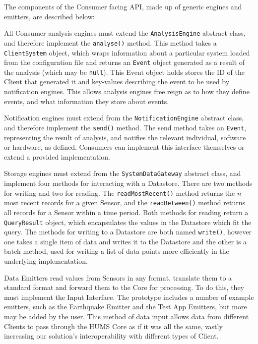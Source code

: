 \documentclass[10pt,a4paper]{article}
\begin{document}
The components of the Consumer facing API, made up of generic engines and emitters, are described below:
\begin{description} [noitemsep]	
	\item[Analysis Engines] All Consumer analysis engines must extend the \texttt{AnalysisEngine} abstract class, and therefore implement the \texttt{analyse()} method. This method takes a \texttt{ClientSystem} object, which wraps information about a particular system loaded from the configuration file and returns an \texttt{Event} object generated as a result of the analysis (which may be \texttt{null}). This Event object holds stores the ID of the Client that generated it and key-values describing the event to be used by notification engines. This allows analysis engines free reign as to how they define events, and what information they store about events.
	\item[Notification Engines] Notification engines must extend from the \texttt{NotificationEngine} abstract class, and therefore implement the \texttt{send()} method. The send method takes an \texttt{Event}, representing the result of analysis, and notifies the relevant individual, software or hardware, as defined. Consumers can implement this interface themselves or extend a provided implementation.
	\item[Storage Engines] Storage engines must extend from the \texttt{SystemDataGateway} abstract class, and implement four methods for interacting with a Datastore. There are two methods for writing and two for reading. The \texttt{readMostRecent()} method returns the $n$ most recent records for a given Sensor, and the \texttt{readBetween()} method returns all records for a Sensor within a time period. Both methods for reading return a \texttt{QueryResult} object, which encapsulates the values in the Datastore which fit the query. The methods for writing to a Datastore are both named \texttt{write()}, however one takes a single item of data and writes it to the Datastore and the other is a batch method, used for writing a list of data points more efficiently in the underlying implementation. 
	\item[Data Emitters] Data Emitters read values from Sensors in any format, translate them to a standard format and forward them to the Core for processing. To do this, they must implement the Input Interface. The prototype includes a number of example emitters, such as the Earthquake Emitter and the Test App Emitters, but more may be added by the user. This method of data input allows data from different Clients to pass through the HUMS Core as if it was all the same, vastly increasing our solution's interoperability with different types of Client.
\end{description}
\end{document}

